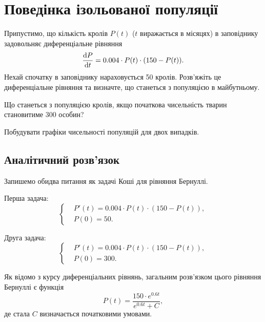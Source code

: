 




\tableofcontents

\section{Поведінка ізольованої популяції}

Припустимо, що кількість кролів $P(t)$ ($t$ виражається в місяцях) в заповіднику задовольняє диференціальне рівняння \[ \frac{\mathop{}\!\mathrm{d} P}{\mathop{}\!\mathrm{d} t} = 0.004 \cdot P(t) \cdot (150 - P(t)). \] Нехай спочатку в заповіднику нараховується 50 кролів. Розв'яжіть це диференціальне рівняння та визначте, що станеться з популяцією в майбутньому. \medskip

Що станеться з популяцією кролів, якщо початкова чисельність тварин становитиме 300 особин? \medskip

Побудувати графіки чисельності популяцій для двох випадків.

\subsection{Аналітичний розв'язок}

Запишемо обидва питання як задачі Коші для рівняння Бернуллі. \medskip

Перша задача:
\begin{equation*}
	\left\{
		\begin{aligned}
			& P'(t) = 0.004 \cdot P(t) \cdot (150 - P(t)), \\
			& P(0) = 50.
		\end{aligned}
	\right.
\end{equation*}

Друга задача:
\begin{equation*}
	\left\{
		\begin{aligned}
			& P'(t) = 0.004 \cdot P(t) \cdot (150 - P(t)), \\
			& P(0) = 300.
		\end{aligned}
	\right.
\end{equation*}

Як відомо з курсу диференціальних рівнянь, загальним розв'язком цього рівняння Бернуллі є функція
\begin{equation*}
	P(t) = \frac{150 \cdot e^{0.6 t}}{e^{0.6 t} + C},
\end{equation*}
де стала $C$ визначається початковими умовами. \medskip

